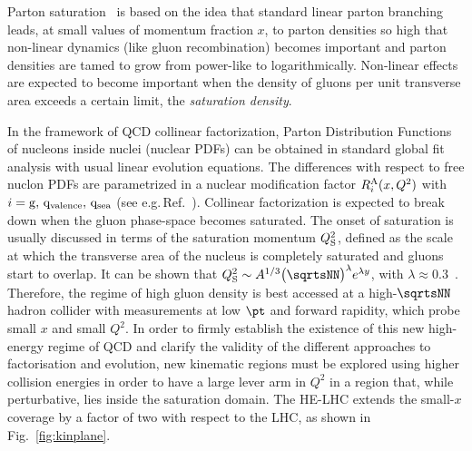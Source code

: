 \documentclass[../report.tex]{subfiles}
\begin{document}
Parton saturation~\cite{Gribov:1984tu,Mueller:1985wy} is based on the idea that standard linear parton branching  leads, at small values of momentum fraction $x$, to parton densities so high that non-linear dynamics (like gluon recombination) becomes important and parton densities are tamed to grow from power-like to logarithmically. Non-linear effects are expected to become important when the density of gluons per unit transverse area exceeds a certain limit, the \textit{saturation density}. 

In the framework of QCD collinear factorization, Parton Distribution Functions of nucleons inside nuclei (nuclear PDFs) can be obtained in standard global fit analysis with usual linear evolution equations. 
The differences with respect to free nuclon PDFs are parametrized in a nuclear modification factor
$R_i^{\rm A}(x,Q^2)$ with $i=\rm g,\,q_{\rm valence},\,q_{\rm sea}$ (see e.g.\,Ref.~\cite{Arneodo:1992wf}).
Collinear factorization 
is expected to break down when the gluon phase-space becomes saturated.
The onset of saturation is usually discussed in terms of the 
saturation momentum $Q_{\rm S}^2$, defined as the 
scale at which the transverse area of the nucleus is completely saturated and gluons start to overlap.
It can be shown that $Q^2_{\rm S} \sim {A}^{1/3} \big(\sqrtsNN\big)^\lambda e^{\lambda y}$,  with $\lambda \approx 0.3$~\cite{Dainese:2016gch}.
Therefore, the regime of high gluon density is best accessed at a high-$\sqrtsNN$ hadron 
collider  with measurements at low $\pt$ and forward rapidity, which probe small $x$ and small $Q^2$.
In order to firmly establish the existence of this new high-energy regime of QCD and clarify the validity of the different approaches to factorisation and evolution, new kinematic regions must be explored using higher collision energies in order to have a large lever arm in $Q^2$ in a region that, while perturbative, lies inside the saturation domain. The HE-LHC extends the small-$x$ coverage by a factor of two with respect to the LHC, as shown in Fig.~\ref{fig:kinplane}. 
\end{document}
